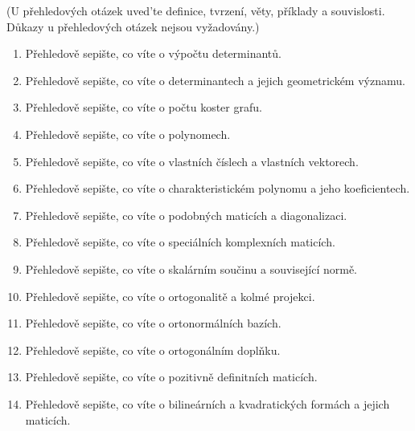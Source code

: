 \documentclass[10pt,a4paper]{article}
\theoremstyle{plain}
\theoremstyle{definition}
\begin{document}
(U přehledových otázek uved'te definice, tvrzení, věty, příklady a souvislosti. Důkazy u přehledových otázek nejsou vyžadovány.)
\begin{enumerate}
\item Přehledově sepište, co víte o výpočtu determinantů.
\item Přehledově sepište, co víte o determinantech a jejich geometrickém významu.
\item Přehledově sepište, co víte o počtu koster grafu.
\item Přehledově sepište, co víte o polynomech.
\item Přehledově sepište, co víte o vlastních číslech a vlastních vektorech.
\item Přehledově sepište, co víte o charakteristickém polynomu a jeho koeficientech.
\item Přehledově sepište, co víte o podobných maticích a diagonalizaci.
\item Přehledově sepište, co víte o speciálních komplexních maticích.
\item Přehledově sepište, co víte o skalárním součinu a související normě.
\item Přehledově sepište, co víte o ortogonalitě a kolmé projekci.
\item Přehledově sepište, co víte o ortonormálních bazích.
\item Přehledově sepište, co víte o ortogonálním doplňku.
\item Přehledově sepište, co víte o pozitivně definitních maticích.
\item Přehledově sepište, co víte o bilineárních a kvadratických formách a jejich maticích.
\end{enumerate}
\end{document}
